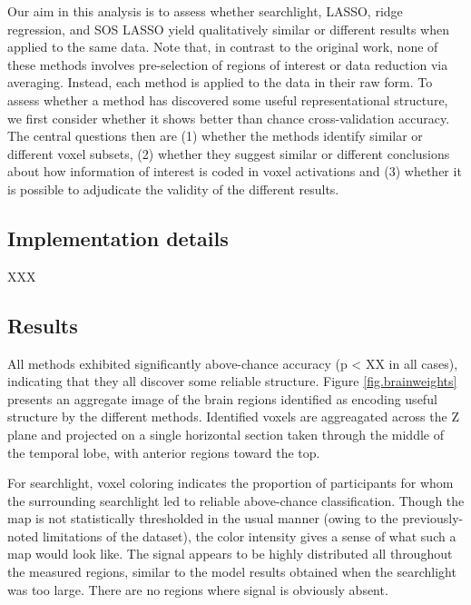 Our aim in this analysis is to assess whether searchlight, LASSO, ridge regression, and SOS LASSO yield qualitatively similar or different results when applied to the same data. Note that, in contrast to the original work, none of these methods involves pre-selection of regions of interest or data reduction via averaging. Instead, each method is applied to the data in their raw form. To assess whether a method has discovered some useful representational structure, we first consider whether it shows better than chance cross-validation accuracy. The central questions then are (1) whether the methods identify similar or different voxel subsets, (2) whether they suggest similar or different conclusions about how information of interest is coded in voxel activations and (3) whether it is possible to adjudicate the validity of the different results.

\subsection{Implementation details}

XXX

\subsection{Results}

All methods exhibited significantly above-chance accuracy (p < XX in all cases), indicating that they all discover some reliable structure. Figure \ref{fig.brainweights} presents an aggregate image of the brain regions identified as encoding useful structure by the different methods. Identified voxels are aggreagated across the Z plane and projected on a single horizontal section taken through the middle of the temporal lobe, with anterior regions toward the top. 

For searchlight, voxel coloring indicates the proportion of participants for whom the surrounding searchlight led to reliable above-chance classification. Though the map is not statistically thresholded in the usual manner (owing to the previously-noted limitations of the dataset), the color intensity gives a sense of what such a map would look like. The signal appears to be highly distributed all throughout the measured regions, similar to the model results obtained when the searchlight was too large. There are no regions where signal is obviously absent. 

